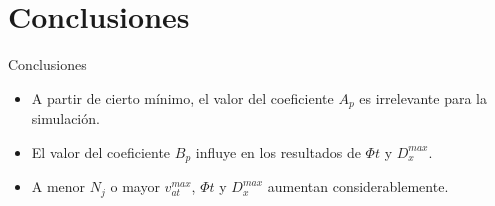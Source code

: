 \section{Conclusiones}\label{sec:conclusiones}

\begin{frame}{Conclusiones}
    \Large{
        \begin{itemize}
            \item A partir de cierto mínimo, el valor del coeficiente $A_p$ es irrelevante para la simulación.
            \item El valor del coeficiente $B_p$ influye en los resultados de $\Phi t$ y $D_x^{max}$.
            \item A menor $N_j$ o mayor $v_{at}^{max}$, $\Phi t$ y $D_x^{max}$ aumentan considerablemente.
        \end{itemize}
    }
\end{frame}